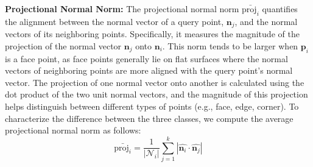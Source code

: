 \documentclass[lettersize,journal]{IEEEtran}
\begin{document}

\textbf{Projectional Normal Norm:} The projectional normal norm $\bar{\text{proj}_i}$ quantifies the alignment between the normal vector of a query point, $\mathbf{n}_j$, and the normal vectors of its neighboring points. Specifically, it measures the magnitude of the projection of the normal vector $\mathbf{n}_j$ onto $\mathbf{n}_i$. This norm tends to be larger when $\mathbf{p}_i$ is a face point, as face points generally lie on flat surfaces where the normal vectors of neighboring points are more aligned with the query point's normal vector. The projection of one normal vector onto another is calculated using the dot product of the two unit normal vectors, and the magnitude of this projection helps distinguish between different types of points (e.g., face, edge, corner). To characterize the difference between the three classes, we compute the average projectional normal norm as follows:
\begin{equation}
    \bar{\text{proj}_i} = \frac{1}{|\mathcal{N}_i|} \sum_{j = 1}^k |\hat{\mathbf{n}_i} \cdot \hat{\mathbf{n}_j}|
    \label{eq:proj_i}
\end{equation}

\end{document}
